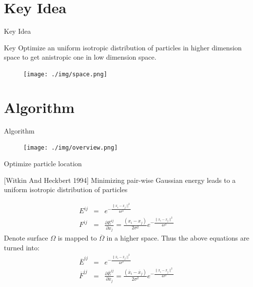 \documentclass{beamer}
\begin{document}
\section{Key Idea}
\begin{frame}{Key Idea}
\begin{block}{Key}
Optimize an uniform isotropic distribution of particles in higher dimension space to get anistropic one in low dimension space.
\end{block}
\begin{figure}[!htb]
\texttt{[image: ./img/space.png]}
\end{figure}
\end{frame}

\section{Algorithm}
\begin{frame}{Algorithm}
\begin{figure}[!htb]
\texttt{[image: ./img/overview.png]}
\end{figure}
\end{frame}

\begin{frame}{Optimize particle location}
\begin{block}{}
[Witkin And Heckbert 1994] Minimizing pair-wise Gaussian energy leads to a uniform isotropic distribution of particles
\end{block}
\begin{eqnarray*}
E^{ij} &=&e^{-\frac{\|x_i-x_j\|^2}{4\sigma^2}}\\
F^{ij} &=& \frac{\partial E^{ij}}{\partial x_j} = \frac{(x_i-x_j)}{2\sigma^2}e^{-\frac{\|x_i-x_j\|^2}{4\sigma^2}}
\end{eqnarray*}
Denote surface $\Omega$ is mapped to $\overline{\Omega}$ in a higher space. Thus the above equations are turned into:
\begin{eqnarray*}
\overline{E}^{ij} &=&e^{-\frac{\|\overline{x}_i-\overline{x}_j\|^2}{4\sigma^2}}\\
\overline{F}^{ij} &=& \frac{\partial \overline{E}^{ij}}{\partial \overline{x}_j} = \frac{(\overline{x}_i-\overline{x}_j)}{2\sigma^2}e^{-\frac{\|\overline{x}_i-\overline{x}_j\|^2}{4\sigma^2}}
\end{eqnarray*}
\end{frame}
\end{document}
